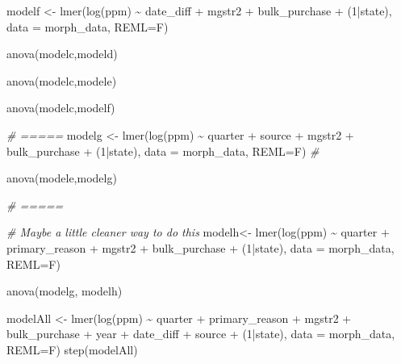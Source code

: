 \documentclass[
  11pt,
]{article}
\newenvironment{Shaded}{\begin{snugshade}}{\end{snugshade}}
\newcommand{\AttributeTok}[1]{\textcolor[rgb]{0.77,0.63,0.00}{#1}}
\newcommand{\CommentTok}[1]{\textcolor[rgb]{0.56,0.35,0.01}{\textit{#1}}}
\newcommand{\DecValTok}[1]{\textcolor[rgb]{0.00,0.00,0.81}{#1}}
\newcommand{\FunctionTok}[1]{\textcolor[rgb]{0.00,0.00,0.00}{#1}}
\newcommand{\NormalTok}[1]{#1}
\newcommand{\OtherTok}[1]{\textcolor[rgb]{0.56,0.35,0.01}{#1}}
\newcommand{\SpecialCharTok}[1]{\textcolor[rgb]{0.00,0.00,0.00}{#1}}
\begin{document}
\begin{Shaded}
\begin{Highlighting}[]
\NormalTok{modelf }\OtherTok{\textless{}{-}} \FunctionTok{lmer}\NormalTok{(}\FunctionTok{log}\NormalTok{(ppm) }\SpecialCharTok{\textasciitilde{}}\NormalTok{ date\_diff }\SpecialCharTok{+}\NormalTok{ mgstr2 }\SpecialCharTok{+}\NormalTok{ bulk\_purchase }\SpecialCharTok{+}\NormalTok{ (}\DecValTok{1}\SpecialCharTok{|}\NormalTok{state), }\AttributeTok{data =}\NormalTok{ morph\_data, }\AttributeTok{REML=}\NormalTok{F)}

\FunctionTok{anova}\NormalTok{(modelc,modeld)}

\FunctionTok{anova}\NormalTok{(modelc,modele)}

\FunctionTok{anova}\NormalTok{(modelc,modelf)}


\CommentTok{\# =====}
\NormalTok{modelg }\OtherTok{\textless{}{-}} \FunctionTok{lmer}\NormalTok{(}\FunctionTok{log}\NormalTok{(ppm) }\SpecialCharTok{\textasciitilde{}}\NormalTok{  quarter }\SpecialCharTok{+}\NormalTok{ source }\SpecialCharTok{+}\NormalTok{ mgstr2 }\SpecialCharTok{+}\NormalTok{ bulk\_purchase }\SpecialCharTok{+}\NormalTok{ (}\DecValTok{1}\SpecialCharTok{|}\NormalTok{state), }\AttributeTok{data =}\NormalTok{ morph\_data, }\AttributeTok{REML=}\NormalTok{F) }\CommentTok{\#}

\FunctionTok{anova}\NormalTok{(modele,modelg)}

\CommentTok{\# =====}

\CommentTok{\# Maybe a little cleaner way to do this}
\NormalTok{modelh}\OtherTok{\textless{}{-}} \FunctionTok{lmer}\NormalTok{(}\FunctionTok{log}\NormalTok{(ppm) }\SpecialCharTok{\textasciitilde{}}\NormalTok{  quarter }\SpecialCharTok{+}\NormalTok{ primary\_reason }\SpecialCharTok{+}\NormalTok{ mgstr2 }\SpecialCharTok{+}\NormalTok{ bulk\_purchase }\SpecialCharTok{+}\NormalTok{ (}\DecValTok{1}\SpecialCharTok{|}\NormalTok{state), }\AttributeTok{data =}\NormalTok{ morph\_data, }\AttributeTok{REML=}\NormalTok{F)}

\FunctionTok{anova}\NormalTok{(modelg, modelh)}

\NormalTok{modelAll }\OtherTok{\textless{}{-}} \FunctionTok{lmer}\NormalTok{(}\FunctionTok{log}\NormalTok{(ppm) }\SpecialCharTok{\textasciitilde{}}\NormalTok{ quarter }\SpecialCharTok{+}\NormalTok{ primary\_reason }\SpecialCharTok{+}\NormalTok{ mgstr2 }\SpecialCharTok{+}\NormalTok{ bulk\_purchase }\SpecialCharTok{+}\NormalTok{ year }\SpecialCharTok{+}\NormalTok{ date\_diff }\SpecialCharTok{+}\NormalTok{ source }\SpecialCharTok{+}\NormalTok{ (}\DecValTok{1}\SpecialCharTok{|}\NormalTok{state), }\AttributeTok{data =}\NormalTok{ morph\_data, }\AttributeTok{REML=}\NormalTok{F)}
\FunctionTok{step}\NormalTok{(modelAll)}
\end{Highlighting}
\end{Shaded}
\end{document}
